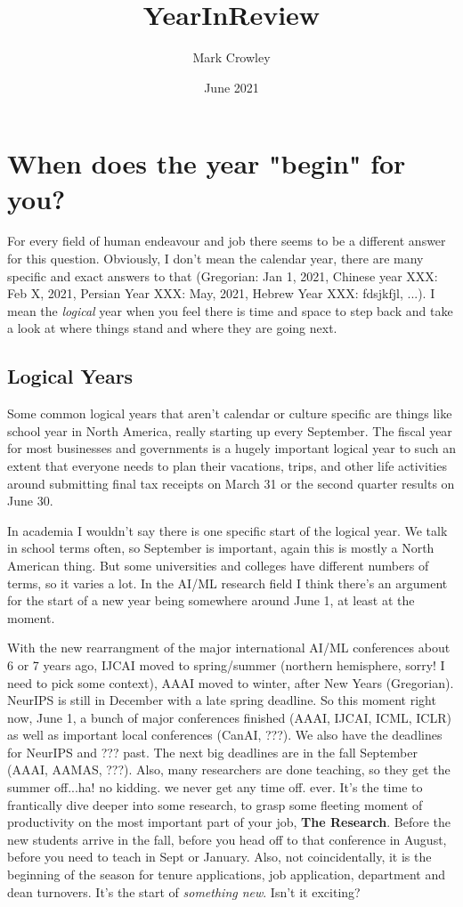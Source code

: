 \documentclass{article}
\title{YearInReview}
\author{Mark Crowley}
\date{June 2021}
\begin{document}
\maketitle

\section{When does the year "begin" for you?}
For every field of human endeavour and job there seems to be a different answer for this question. Obviously, I don't mean the calendar year, there are many specific and exact answers to that (Gregorian: Jan 1, 2021, Chinese year XXX: Feb X, 2021, Persian Year XXX: May, 2021, Hebrew Year XXX: fdsjkfjl, ...). I mean the \textit{logical} year when you feel there is time and space to step back and take a look at where things stand and where they are going next.

\subsection{Logical Years}
Some common logical years that aren't calendar or culture specific are things like school year in North America, really starting up every September. The fiscal year for most businesses and governments is a hugely important logical year to such an extent that everyone needs to plan their vacations, trips, and other life activities around submitting final tax receipts on March 31 or the second quarter results on June 30.

In academia I wouldn't say there is one specific start of the logical year. We talk in school terms often, so September is important, again this is mostly a North American thing. But some universities and colleges have different numbers of terms, so it varies a lot.
In the AI/ML research field I think there's an argument for the start of a new year being somewhere around June 1, at least at the moment. 

With the new rearrangment of the major international AI/ML conferences about 6 or 7 years ago, IJCAI moved to spring/summer (northern hemisphere, sorry! I need to pick some context), AAAI moved to winter, after New Years (Gregorian). NeurIPS is still in December with a late spring deadline. So this moment right now, June 1, a bunch of major conferences finished (AAAI, IJCAI, ICML, ICLR) as well as important local conferences (CanAI, ???). We also have the deadlines for NeurIPS and ??? past. The next big deadlines are in the fall September (AAAI, AAMAS, ???).  Also, many researchers are done teaching, so they get the summer off...ha! no kidding. we never get any time off. ever. It's the time to frantically dive deeper into some research, to grasp some fleeting moment of productivity on the most important part of your job, \textbf{The Research}. Before the new students arrive in the fall, before you head off to that conference in August, before you need to teach in Sept or January.
Also, not coincidentally, it is the beginning of the season for tenure applications, job application, department and dean turnovers. It's the start of \textit{something new}. Isn't it exciting?
\end{document}
